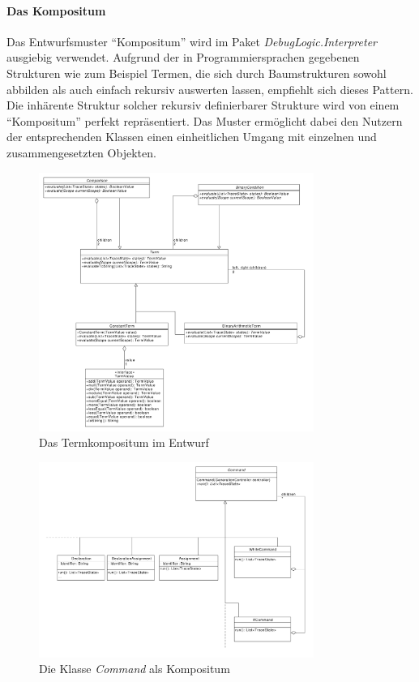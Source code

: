 \documentclass[parskip=full]{scrartcl}
\begin{document}
\paragraph{Das Kompositum}
Das Entwurfsmuster \enquote{Kompositum} wird im Paket \textit{DebugLogic.Interpreter} ausgiebig verwendet. Aufgrund der in Programmiersprachen gegebenen Strukturen wie zum Beispiel Termen, die sich durch Baumstrukturen sowohl abbilden als auch einfach rekursiv auswerten lassen, empfiehlt sich dieses Pattern. Die inhärente Struktur solcher rekursiv definierbarer Strukture wird von einem \enquote{Kompositum} perfekt repräsentiert. Das Muster ermöglicht dabei den Nutzern der entsprechenden Klassen einen einheitlichen Umgang mit einzelnen und zusammengesetzten Objekten.
\begin{figure}[!h]
\centering
\includegraphics[width=0.8\textwidth]{diagrammIdeenUmlet/TermCondition.pdf}
\caption{Das Termkompositum im Entwurf}
\label{Terme}
\end{figure}
\begin{figure}[!h]
\centering
\includegraphics[width=0.8\textwidth]{diagrammIdeenUmlet/CommandComposite.pdf}
\caption{Die Klasse \textit{Command} als Kompositum}
\label{Command}
\end{figure}
\end{document}
